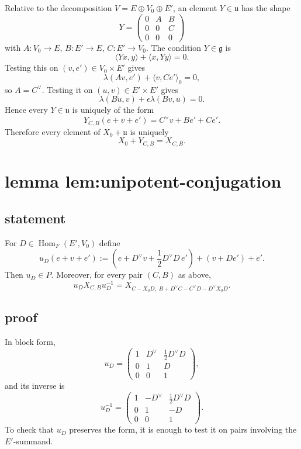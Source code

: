 \documentclass[
  11pt,
]{article}
\begin{document}
Relative to the decomposition \(V=E\oplus V_0\oplus E'\), an element
\(Y\in \mathfrak u\) has the shape \[
Y=
\begin{pmatrix}
0&A&B\\
0&0&C\\
0&0&0
\end{pmatrix}
\] with \(A:V_0\to E\), \(B:E'\to E\), \(C:E'\to V_0\). The condition
\(Y\in \mathfrak g\) is \[
\langle Yx,y\rangle+\langle x,Yy\rangle=0.
\] Testing this on \((v,e')\in V_0\times E'\) gives \[
\lambda(Av,e')+\langle v,Ce'\rangle_0=0,
\] so \(A=C^\vee\). Testing it on \((u,v)\in E'\times E'\) gives \[
\lambda(Bu,v)+\epsilon\lambda(Bv,u)=0.
\] Hence every \(Y\in \mathfrak u\) is uniquely of the form \[
Y_{C,B}(e+v+e')=C^\vee v+Be'+Ce'.
\] Therefore every element of \(X_0+\mathfrak u\) is uniquely \[
X_0+Y_{C,B}=X_{C,B}.
\]

\section{lemma
lem:unipotent-conjugation}\label{lemma-lemunipotent-conjugation}

\subsection{statement}\label{statement-2}

For \(D\in \operatorname{Hom}_F(E',V_0)\) define \[
u_D(e+v+e')
:=\left(e+D^\vee v+\frac12 D^\vee D\,e'\right)+(v+De')+e'.
\] Then \(u_D\in P\). Moreover, for every pair \((C,B)\) as above, \[
u_D X_{C,B} u_D^{-1}
=X_{C-X_0D,\;B+D^\vee C-C^\vee D-D^\vee X_0D}.
\]

\subsection{proof}\label{proof-2}

In block form, \[
u_D=
\begin{pmatrix}
1&D^\vee&\frac12 D^\vee D\\
0&1&D\\
0&0&1
\end{pmatrix},
\] and its inverse is \[
u_D^{-1}=
\begin{pmatrix}
1&-D^\vee&\frac12 D^\vee D\\
0&1&-D\\
0&0&1
\end{pmatrix}.
\] To check that \(u_D\) preserves the form, it is enough to test it on
pairs involving the \(E'\)-summand.
\end{document}
